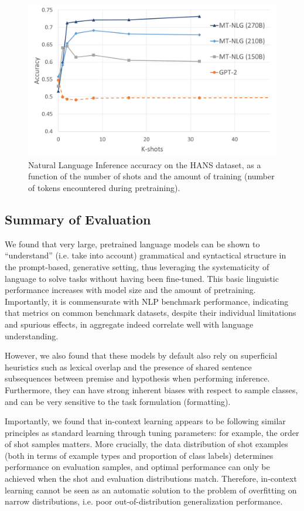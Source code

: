 \documentclass[11pt]{article}
\begin{document}
\begin{figure}
    \centering
    \includegraphics[width=0.8\linewidth]{HANS_30K.png}
    \caption{Natural Language Inference accuracy on the HANS dataset, as a function of the number of shots and the amount of training (number of tokens encountered during pretraining).}
    \label{fig:hans_training_kshot}
\end{figure}



\subsection{Summary of Evaluation}
We found that very large, pretrained language models can be shown to “understand” (i.e. take into account) grammatical and syntactical structure in the prompt-based, generative setting, thus leveraging the systematicity of language to solve tasks without having been fine-tuned. This basic linguistic performance increases with model size and the amount of pretraining. Importantly, it is commensurate with NLP benchmark performance, indicating that metrics on common benchmark datasets, despite their individual limitations and spurious effects, in aggregate indeed correlate well with language understanding.

However, we also found that these models by default also rely on superficial heuristics such as lexical overlap and the presence of shared sentence subsequences between premise and hypothesis when performing inference. Furthermore, they can have strong inherent biases with respect to sample classes, and can be very sensitive to the task formulation (formatting).

Importantly, we found that in-context learning appears to be following similar principles as standard learning through tuning parameters: for example, the order of shot samples matters. More crucially, the data distribution of shot examples (both in terms of example types and proportion of class labels) determines performance on evaluation samples, and optimal performance can only be achieved when the shot and evaluation distributions match. Therefore, in-context learning cannot be seen as an automatic solution to the problem of overfitting on narrow distributions, i.e. poor out-of-distribution generalization performance.
\end{document}

